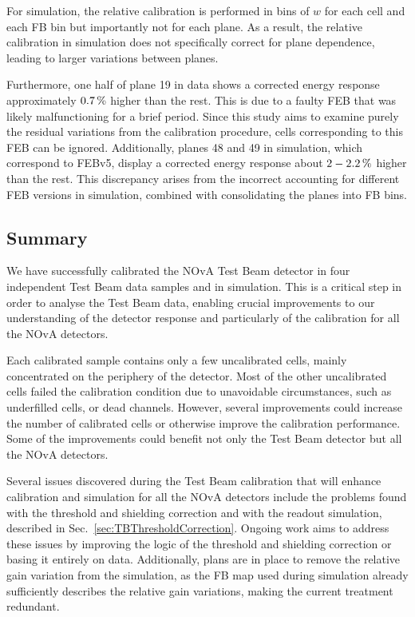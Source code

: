 For simulation, the relative calibration is performed in bins of $w$ for each cell and each \gls{FB} bin but importantly not for each plane. As a result, the relative calibration in simulation does not specifically correct for plane dependence, leading to larger variations between planes.

Furthermore, one half of plane 19 in data shows a corrected energy response approximately $\unit[0.7]{\%}$ higher than the rest. This is due to a faulty \gls{FEB} that was likely malfunctioning for a brief period. Since this study aims to examine purely the residual variations from the calibration procedure, cells corresponding to this \gls{FEB} can be ignored. Additionally, planes 48 and 49 in simulation, which correspond to \gls{FEB}v5, display a corrected energy response about $\unit[2-2.2]{\%}$ higher than the rest. This discrepancy arises from the incorrect accounting for different \gls{FEB} versions in simulation, combined with consolidating the planes into \gls{FB} bins.

\subsection{Summary}

We have successfully calibrated the NOvA Test Beam detector in four independent Test Beam data samples and in simulation. This is a critical step in order to analyse the Test Beam data, enabling crucial improvements to our understanding of the detector response and particularly of the calibration for all the \gls{NOvA} detectors.

Each calibrated sample contains only a few uncalibrated cells, mainly concentrated on the periphery of the detector. Most of the other uncalibrated cells failed the calibration condition due to unavoidable circumstances, such as underfilled cells, or dead channels. However, several improvements could increase the number of calibrated cells or otherwise improve the calibration performance. Some of the improvements could benefit not only the Test Beam detector but all the \gls{NOvA} detectors.

Several issues discovered during the Test Beam calibration that will enhance calibration and simulation for all the \gls{NOvA} detectors include the problems found with the threshold and shielding correction and with the readout simulation, described in Sec.~\ref{sec:TBThresholdCorrection}. Ongoing work aims to address these issues by improving the logic of the threshold and shielding correction or basing it entirely on data. Additionally, plans are in place to remove the relative gain variation from the simulation, as the \gls{FB} map used during simulation already sufficiently describes the relative gain variations, making the current treatment redundant.

